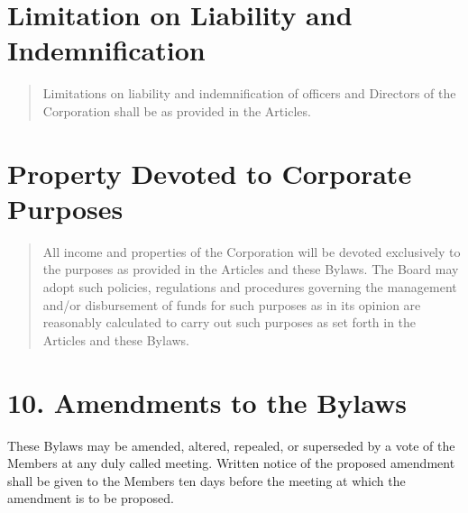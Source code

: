 \documentclass[
]{book}
\begin{document}
\section{Limitation on Liability and Indemnification}\label{limitation-on-liability-and-indemnification}

\begin{quote}
Limitations on liability and indemnification of officers and Directors
of the Corporation shall be as provided in the Articles.
\end{quote}

\section{Property Devoted to Corporate Purposes}\label{property-devoted-to-corporate-purposes}

\begin{quote}
All income and properties of the Corporation will be devoted
exclusively to the purposes as provided in the Articles and these
Bylaws. The Board may adopt such policies, regulations and procedures
governing the management and/or disbursement of funds for such
purposes as in its opinion are reasonably calculated to carry out such
purposes as set forth in the Articles and these Bylaws.
\end{quote}

\section{10. Amendments to the Bylaws}\label{amendments-to-the-bylaws}

These Bylaws may be amended, altered, repealed, or superseded by a vote
of the Members at any duly called meeting. Written notice of the
proposed amendment shall be given to the Members ten days before the
meeting at which the amendment is to be proposed.
\end{document}
